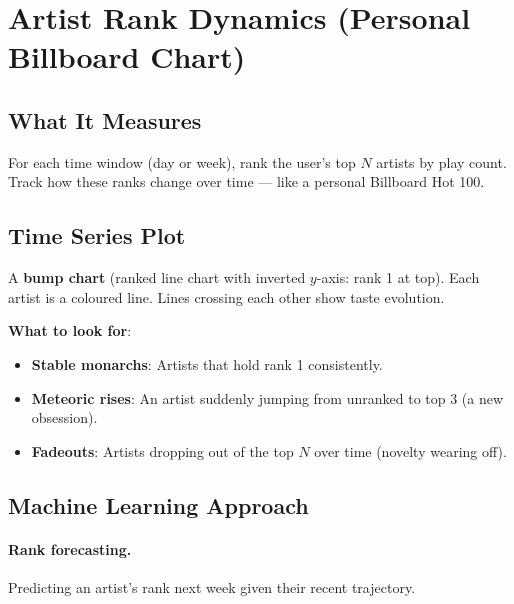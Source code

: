 \documentclass[12pt, a4paper]{article}
\begin{document}
\section{Artist Rank Dynamics (Personal Billboard Chart)}

\subsection{What It Measures}

For each time window (day or week), rank the user's top $N$ artists by play
count. Track how these ranks change over time --- like a personal Billboard
Hot 100.

\subsection{Time Series Plot}

A \textbf{bump chart} (ranked line chart with inverted $y$-axis: rank 1 at
top). Each artist is a coloured line. Lines crossing each other show
taste evolution.

\textbf{What to look for}:
\begin{itemize}
    \item \textbf{Stable monarchs}: Artists that hold rank 1 consistently.
    \item \textbf{Meteoric rises}: An artist suddenly jumping from unranked
          to top 3 (a new obsession).
    \item \textbf{Fadeouts}: Artists dropping out of the top $N$ over time
          (novelty wearing off).
\end{itemize}

\subsection{Machine Learning Approach}

\paragraph{Rank forecasting.}
Predicting an artist's rank next week given their recent trajectory.
\end{document}
